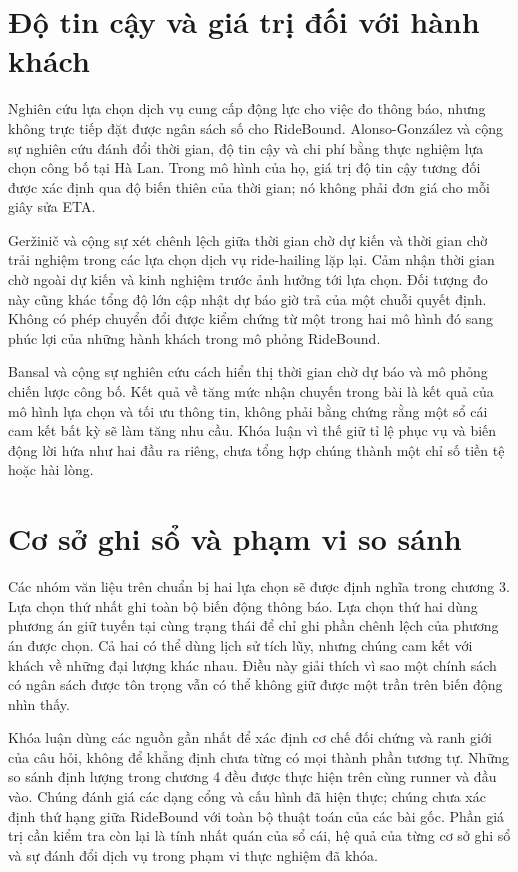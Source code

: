 \section{Độ tin cậy và giá trị đối với hành khách}

Nghiên cứu lựa chọn dịch vụ cung cấp động lực cho việc đo thông báo, nhưng không trực
tiếp đặt được ngân sách số cho RideBound. Alonso-González và cộng sự
\cite{alonsogonzalez2020} nghiên cứu đánh đổi thời gian, độ tin cậy và chi phí bằng
thực nghiệm lựa chọn công bố tại Hà Lan. Trong mô hình của họ, giá trị độ tin cậy
tương đối được xác định qua độ biến thiên của thời gian; nó không phải đơn giá cho
mỗi giây sửa ETA.

Geržinič và cộng sự \cite{gerzinic2023} xét chênh lệch giữa thời gian chờ dự kiến và
thời gian chờ trải nghiệm trong các lựa chọn dịch vụ ride-hailing lặp lại. Cảm nhận
thời gian chờ ngoài dự kiến và kinh nghiệm trước ảnh hưởng tới lựa chọn. Đối tượng
đo này cũng khác tổng độ lớn cập nhật dự báo giờ trả của một chuỗi quyết định.
Không có phép chuyển đổi được kiểm chứng từ một trong hai mô hình đó sang phúc lợi
của những hành khách trong mô phỏng RideBound.

Bansal và cộng sự \cite{bansal2019} nghiên cứu cách hiển thị thời gian chờ dự báo và
mô phỏng chiến lược công bố. Kết quả về tăng mức nhận chuyến trong bài là kết quả
của mô hình lựa chọn và tối ưu thông tin, không phải bằng chứng rằng một sổ cái cam
kết bất kỳ sẽ làm tăng nhu cầu. Khóa luận vì thế giữ tỉ lệ phục vụ và biến động lời
hứa như hai đầu ra riêng, chưa tổng hợp chúng thành một chỉ số tiền tệ hoặc hài lòng.

\section{Cơ sở ghi sổ và phạm vi so sánh}

Các nhóm văn liệu trên chuẩn bị hai lựa chọn sẽ được định nghĩa trong chương 3.
Lựa chọn thứ nhất ghi toàn bộ biến động thông báo. Lựa chọn thứ hai dùng phương án
giữ tuyến tại cùng trạng thái để chỉ ghi phần chênh lệch của phương án được chọn.
Cả hai có thể dùng lịch sử tích lũy, nhưng chúng cam kết với khách về những đại lượng
khác nhau. Điều này giải thích vì sao một chính sách có ngân sách được tôn trọng vẫn
có thể không giữ được một trần trên biến động nhìn thấy.

Khóa luận dùng các nguồn gần nhất để xác định cơ chế đối chứng và ranh giới của câu
hỏi, không để khẳng định chưa từng có mọi thành phần tương tự. Những so sánh định
lượng trong chương 4 đều được thực hiện trên cùng runner và đầu vào. Chúng đánh giá
các dạng cổng và cấu hình đã hiện thực; chúng chưa xác định thứ hạng giữa RideBound
với toàn bộ thuật toán của các bài gốc. Phần giá trị cần kiểm tra còn lại là tính
nhất quán của sổ cái, hệ quả của từng cơ sở ghi sổ và sự đánh đổi dịch vụ trong phạm
vi thực nghiệm đã khóa.
